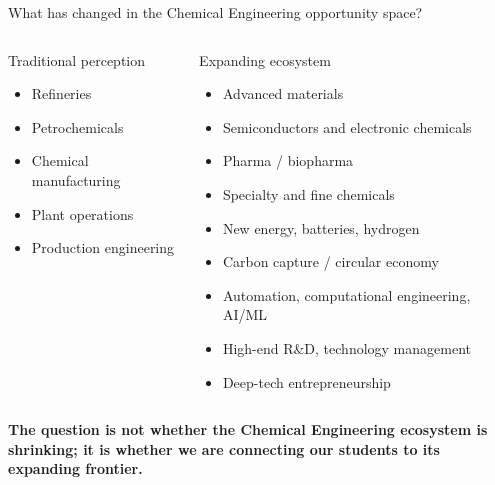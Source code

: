 \documentclass[aspectratio=169,11pt]{beamer}
\newcommand{\key}[1]{\textbf{\color{IITblue}#1}}
\begin{document}
\begin{frame}{What has changed in the Chemical Engineering opportunity space?}
\begin{columns}[T]
\begin{block}{Traditional perception}
\begin{itemize}
\item Refineries
\item Petrochemicals
\item Chemical manufacturing
\item Plant operations
\item Production engineering
\end{itemize}
\end{block}
\begin{block}{Expanding ecosystem}
\begin{itemize}
\item Advanced materials
\item Semiconductors and electronic chemicals
\item Pharma / biopharma
\item Specialty and fine chemicals
\item New energy, batteries, hydrogen
\item Carbon capture / circular economy
\item Automation, computational engineering, AI/ML
\item High-end R\&D, technology management
\item Deep-tech entrepreneurship
\end{itemize}
\end{block}
\end{columns}
\vspace{3mm}
\centering\large\key{The question is not whether the Chemical Engineering ecosystem is shrinking; it is whether we are connecting our students to its expanding frontier.}
\end{frame}
\end{document}
